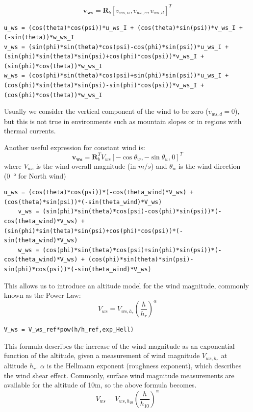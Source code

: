\begin{equation}
\bm{v_{ws}} = \bm{R}_b[v_{ws,n}, v_{ws,e}, v_{ws,d}]^T
\end{equation}

\begin{lstlisting}[style=C-style]
u_ws = (cos(theta)*cos(psi))*u_ws_I + (cos(theta)*sin(psi))*v_ws_I + (-sin(theta))*w_ws_I
v_ws = (sin(phi)*sin(theta)*cos(psi)-cos(phi)*sin(psi))*u_ws_I + (sin(phi)*sin(theta)*sin(psi)+cos(phi)*cos(psi))*v_ws_I + (sin(phi)*cos(theta))*w_ws_I
w_ws = (cos(phi)*sin(theta)*cos(psi)+sin(phi)*sin(psi))*u_ws_I + (cos(phi)*sin(theta)*sin(psi)-sin(phi)*cos(psi))*v_ws_I + (cos(phi)*cos(theta))*w_ws_I
\end{lstlisting}

Usually we consider the vertical component of the wind to be zero ($v_{ws,d}=0$), but this is not true in environments such as mountain slopes or in regions with thermal currents.

Another useful expression for constant wind is:
\begin{equation}
\bm{v_{ws}} = \bm{R}_b^TV_{ws}[-\cos\theta_w, -\sin\theta_w, 0]^T
\end{equation}
where $V_{ws}$ is the wind overall magnitude (in $m/s$) and $\theta_w$ is the wind direction (\SI{0}{\degree} for North wind)

\begin{lstlisting}[style=C-style]
	u_ws = (cos(theta)*cos(psi))*(-cos(theta_wind)*V_ws) + (cos(theta)*sin(psi))*(-sin(theta_wind)*V_ws)
	v_ws = (sin(phi)*sin(theta)*cos(psi)-cos(phi)*sin(psi))*(-cos(theta_wind)*V_ws) + (sin(phi)*sin(theta)*sin(psi)+cos(phi)*cos(psi))*(-sin(theta_wind)*V_ws)
	w_ws = (cos(phi)*sin(theta)*cos(psi)+sin(phi)*sin(psi))*(-cos(theta_wind)*V_ws) + (cos(phi)*sin(theta)*sin(psi)-sin(phi)*cos(psi))*(-sin(theta_wind)*V_ws)
\end{lstlisting}

This allows us to introduce an altitude model for the wind magnitude, commonly known as the Power Law:
\begin{equation}
V_{ws} = V_{ws,h_r} \left(\frac{h}{h_r}\right)^\alpha
\end{equation}

\begin{lstlisting}[style=C-style]
	V_ws = V_ws_ref*pow(h/h_ref,exp_Hell)
\end{lstlisting}

This formula describes the increase of the wind magnitude as an exponential function of the altitude, given a measurement of wind magnitude $V_{ws,h_r}$ at altitude $h_r$. $\alpha$ is the Hellmann exponent (roughness exponent), which describes the wind shear effect. Commonly, surface wind magnitude measurements are available for the altitude of 10m, so the above formula becomes.
\begin{equation} \label{eq:staticWind10}
V_{ws} = V_{ws,h_{10}} \left(\frac{h}{h_{10}}\right)^\alpha
\end{equation}

